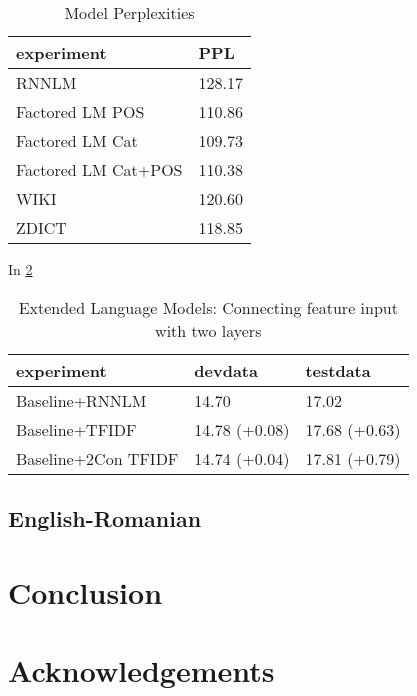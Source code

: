 \documentclass[a4paper]{article}
\begin{document}
\begin{table} 
  \caption{Model Perplexities}
  \centering
  \begin{tabular}{ ll}
  	\hline
  	experiment          & PPL    \\ \hline\hline
  	RNNLM               & 128.17 \\ \hline
  	Factored LM POS     & 110.86 \\
  	Factored LM Cat     & 109.73 \\
  	Factored LM Cat+POS & 110.38 \\ \hline
  	WIKI                & 120.60 \\
  	ZDICT               & 118.85 \\ \hline
  \end{tabular}
  \label{tb:PPL}
\end{table}

In \ref{tb:zh-extended-both} 


\begin{table}
\caption{Extended Language Models: Connecting feature input with two layers}
\centering
  \begin{tabular}{lll}
  	\hline
  	experiment          & devdata       & testdata      \\ \hline\hline
  	Baseline+RNNLM      & 14.70         & 17.02         \\ \hline
  	Baseline+TFIDF      & 14.78 (+0.08) & 17.68 (+0.63) \\
  	Baseline+2Con TFIDF & 14.74 (+0.04) & 17.81 (+0.79)
  \end{tabular}
  \label{tb:zh-extended-both}
\end{table}

\subsection{English-Romanian}
\section{Conclusion}
\section{Acknowledgements}
\end{document}
